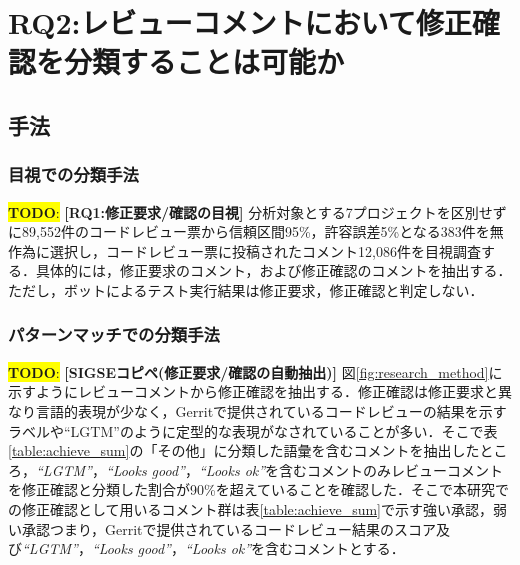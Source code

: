 \documentclass[11pt]{jreport}
\newcommand{\RQTwo}{レビューコメントにおいて修正確認を分類することは可能か}
\newcommand{\todo}[1]{\colorbox{yellow}{{\bf TODO}:}{\color{red} {\textbf{[#1]}}}}
\begin{document}
\begin{table}[t]
\centering
  \caption{修正要求内容毎の再現率}
  \label{table:request_accuracy}
\end{table}

\chapter{RQ2:\RQTwo}\label{sec:RQ2}

\section{手法}
\subsection{目視での分類手法}

\todo{RQ1:修正要求/確認の目視}
分析対象とする7プロジェクトを区別せずに89,552件のコードレビュー票から信頼区間95\%，許容誤差5\%となる383件を無作為に選択し，コードレビュー票に投稿されたコメント12,086件を目視調査する．具体的には，修正要求のコメント，および修正確認のコメントを抽出する．ただし，ボットによるテスト実行結果は修正要求，修正確認と判定しない．

\subsection{パターンマッチでの分類手法}

\todo{SIGSEコピペ(修正要求/確認の自動抽出)}
図\ref{fig:research_method}に示すようにレビューコメントから修正確認を抽出する．修正確認は修正要求と異なり言語的表現が少なく，Gerritで提供されているコードレビューの結果を示すラベルや``LGTM''のように定型的な表現がなされていることが多い．そこで表\ref{table:achieve_sum}の「その他」に分類した語彙を含むコメントを抽出したところ，\textit{``LGTM''}，\textit{``Looks good''}，\textit{``Looks ok''}を含むコメントのみレビューコメントを修正確認と分類した割合が90\%を超えていることを確認した．そこで本研究での修正確認として用いるコメント群は表\ref{table:achieve_sum}で示す強い承認，弱い承認つまり，Gerritで提供されているコードレビュー結果のスコア及び\textit{``LGTM''}，\textit{``Looks good''}，\textit{``Looks ok''}を含むコメントとする．
\end{document}
